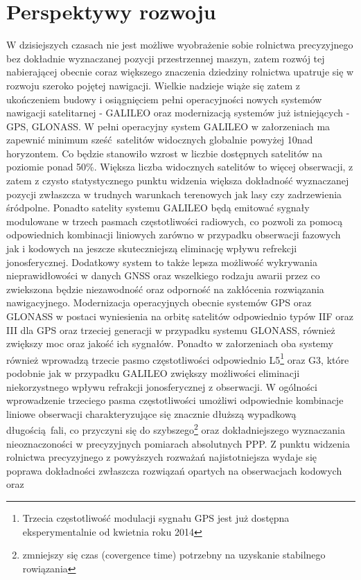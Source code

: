 \section{Perspektywy rozwoju}
W dzisiejszych czasach nie jest możliwe wyobrażenie sobie rolnictwa precyzyjnego bez dokładnie wyznaczanej pozycji przestrzennej maszyn,
zatem rozwój tej nabierającej obecnie coraz większego znaczenia dziedziny rolnictwa upatruje się w rozwoju szeroko pojętej nawigacji.
Wielkie nadzieje wiąże się zatem z ukończeniem budowy i osiągnięciem pełni operacyjności nowych systemów nawigacji satelitarnej - GALILEO oraz modernizacją 
systemów już istniejących - GPS, GLONASS. 
W pełni operacyjny system GALILEO w załorzeniach ma zapewnić minimum sześć satelitów widocznych globalnie powyżej 10\degree nad horyzontem. Co będzie stanowiło 
wzrost w liczbie dostępnych satelitów na poziomie ponad 50\%. Większa liczba widocznych satelitów to więcej obserwacji, z zatem z czysto statystycznego punktu 
widzenia większa dokładność wyznaczanej pozycji zwłaszcza w trudnych warunkach terenowych jak lasy czy zadrzewienia śródpolne. Ponadto satelity systemu GALILEO 
będą emitować sygnały modulowane w trzech pasmach częstotliwości radiowych, co pozwoli za pomocą odpowiednich kombinacji liniowych zarówno w przypadku obserwacji fazowych
jak i kodowych na jeszcze skuteczniejszą eliminację wpływu refrekcji jonosferycznej. Dodatkowy system to także lepsza możliwość wykrywania nieprawidłowości 
w danych GNSS oraz wszelkiego rodzaju awarii przez co zwiekszona będzie niezawodność oraz odporność na zakłócenia rozwiązania nawigacyjnego.
Modernizacja operacyjnych obecnie systemów GPS oraz GLONASS w postaci wyniesienia na orbitę satelitów odpowiednio typów IIF oraz III dla GPS oraz trzeciej generacji 
w przypadku systemu GLONASS, również zwiększy moc oraz jakość ich sygnałów. Ponadto w załorzeniach oba systemy również wprowadzą trzecie pasmo częstotliwości 
odpowiednio L5\footnote{Trzecia częstotliwość modulacji sygnału GPS jest już dostępna eksperymentalnie od kwietnia roku 2014} oraz G3, które podobnie jak w przypadku GALILEO
zwiększy możliwości eliminacji niekorzystnego wpływu refrakcji jonosferycznej z obserwacji. W ogólności wprowadzenie trzeciego pasma częstotliwości umożliwi odpowiednie 
kombinacje liniowe obserwacji charakteryzujące się znacznie dłuższą wypadkową długością fali, co przyczyni się do szybszego\footnote{
zmniejszy się czas (covergence time) potrzebny na uzyskanie stabilnego rowiązania} oraz dokładniejszego wyznaczania nieoznaczoności w precyzyjnych pomiarach absolutnych PPP.
Z punktu widzenia rolnictwa precyzyjnego z powyższych rozważań najistotniejsza wydaje się poprawa dokładności zwłaszcza rozwiązań opartych na obserwacjach kodowych oraz 
